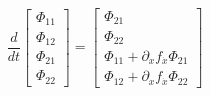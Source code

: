 \documentclass[10pt]{article}
\begin{document}
\begin{equation}
  \frac{d}{dt} \left[ \begin{array}{c} \Phi_{11} \\ \Phi_{12} \\ \Phi_{21} \\ \Phi_{22} \end{array} \right]
    = 
  \left[ \begin{array}{c} \Phi_{21}                                   \\ \Phi_{22} \\
                          \Phi_{11} + \partial_x f_{\dot x} \Phi_{21} \\ \Phi_{12} + \partial_x f_{\dot x} \Phi_{22} 
         \end{array} 
  \right]
\end{equation}
\end{document}
